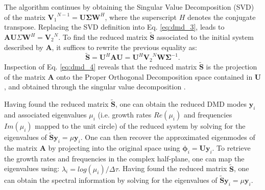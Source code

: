 \documentclass[a4paper,conference]{IEEEtran}
\begin{document}
The algorithm continues by obtaining the Singular Value Decomposition (SVD) of the matrix ${\mathbf{V}_1}^{N-1}=\mathbf{U}\mathbf{\Sigma}\mathbf{W}^H$, where the superscript $H$ denotes the conjugate transpose. Replacing the SVD definition into Eq. \ref{eq:dmd_3}, leads to $\mathbf{A}\mathbf{U}\Sigma\mathbf{W}^H={\mathbf{V}_2}^{N}$. To find the reduced matrix $\mathbf{\widetilde{S}}$ associated to the initial system described by $\mathbf{A}$, it suffices to rewrite the previous equality as:
  \begin{equation}\label{eq:dmd_4}
   \mathbf{\widetilde{S}}=\mathbf{U}^H\mathbf{A}{\mathbf{U}}=\mathbf{U}^H{\mathbf{V}_2}^{N}\mathbf{W}\mathbf{\Sigma}^{-1}.
  \end{equation}
  Inspection of Eq. \ref{eq:dmd_4} reveals that the reduced matrix $\mathbf{\widetilde{S}}$ is the projection of the matrix $\mathbf{{A}}$ onto the Proper Orthogonal Decomposition space contained in $\mathbf{U}$, and obtained through the singular value decomposition \cite{DMDSchmid}.

 Having found the reduced matrix $\mathbf{\widetilde{S}}$, one can obtain the reduced DMD modes $\mathbf{y}_i$ and associated eigenvalues $\mu_i$ (i.e. growth rates $Re(\mu_i)$ and frequencies $Im(\mu_i)$ mapped to the unit circle) of the reduced system by solving for the eigenvalues of $\mathbf{{\widetilde{S}}}\mathbf{y}_i=\mu\mathbf{y}_i$. One can then recover the approximated eigenmodes of the matrix
   $\mathbf{A}$ by projecting into the original space using $\mathbf{\phi}_i=\mathbf{U}\mathbf{y}_i$. To retrieve the growth rates and frequencies in the complex half-plane, one can map the eigenvalues using: $\lambda_i=log(\mu_i)/\Delta \tau$.
  Having found the reduced matrix $\mathbf{\widetilde{S}}$, one can obtain the spectral information by solving for the eigenvalues of $\mathbf{\widetilde{S}}\mathbf{y}_i=\mu\mathbf{y}_i$.

%
\end{document}
